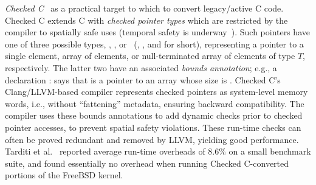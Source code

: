 \emph{Checked C}~\cite{tarditi2018checked} as a
practical target to which to convert legacy/active C code. 
Checked C
extends C with \emph{checked pointer
  types} which are restricted by the compiler to spatially safe uses (temporal safety is underway~\cite{checkedc:temporal}).
Such pointers have one of three possible types, , ,
or~ (\ptr, \arr, and \ntarr{} for short), representing a
pointer to a single element, array of elements, or null-terminated
array of elements of type $T$, respectively. The latter two have an
associated \emph{bounds annotation}; e.g., a declaration 
 :  says that  is a pointer to an  array
whose size is .
%
Checked C's Clang/LLVM-based compiler represents checked
pointers as system-level memory words, i.e., without
``fattening'' metadata, ensuring backward compatibility.
The compiler uses these bounds annotations to add dynamic checks prior to
checked pointer accesses, to prevent spatial safety violations.
These run-time checks can often be proved redundant and removed by LLVM, yielding good performance.
%
Tarditi et al.~\cite{tarditi2018checked} reported average
run-time overheads of 8.6\% on a small benchmark suite, and
\cite{duanrefactoring} found essentially no overhead when running
Checked C-converted portions of the FreeBSD kernel.

